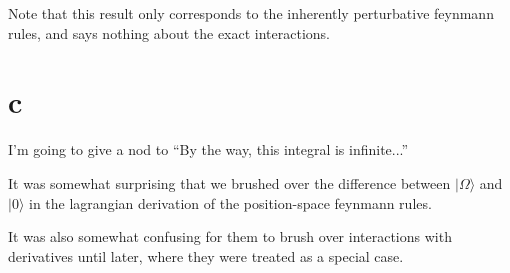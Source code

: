\documentclass{article}
\begin{document}
Note that this result only corresponds to the inherently perturbative
	feynmann rules, and says nothing about the exact interactions.

\section{c}

I'm going to give a nod to ``By the way, this integral is infinite...''

It was somewhat surprising that we brushed over the difference
	between $\mid \Omega \rangle$ and $\mid 0 \rangle$ in the 
	lagrangian derivation of the position-space feynmann rules.

It was also somewhat confusing for them to brush over interactions
	with derivatives until later, where they were treated as a special case.
\end{document}
